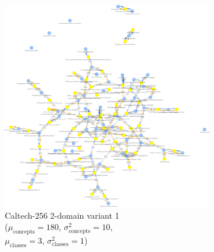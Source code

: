\begin{figure}[ht]
      \centering
      \begin{subfigure}[b]{0.4\textwidth}
            \centering
            \includegraphics[width=\textwidth]{figures/caltech256_2domain.png}
            \caption{Caltech-256 2-domain variant 1\\
            ($\mu_{\text{concepts}}=180$, $\sigma^2_{\text{concepts}}=10$,\\
            $\mu_{\text{classes}}=3$, $\sigma^2_{\text{classes}}=1$)}
            \label{fig:caltech256_2domain}
      \end{subfigure}
      \hfill
      \begin{subfigure}[b]{0.4\textwidth}
            \centering

\end{subfigure}
\end{figure}

